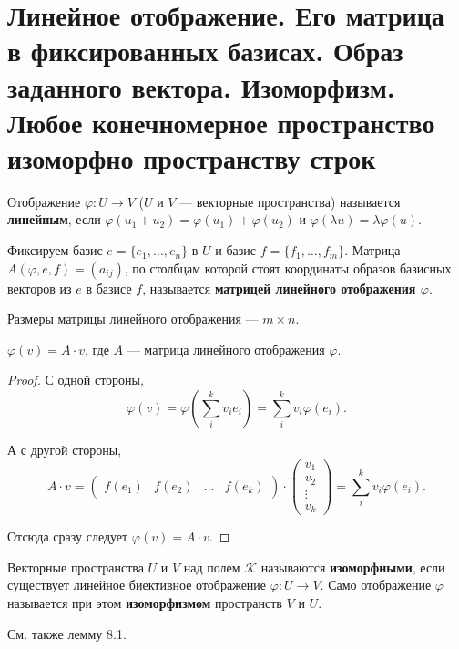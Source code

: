 \section{Линейное отображение. Его матрица в фиксированных базисах. Образ заданного вектора. Изоморфизм. Любое конечномерное пространство изоморфно пространству строк}

\begin{definition}
    Отображение $\varphi: U \rightarrow V$ ($U$ и $V$ --- векторные пространства) называется \textbf{линейным}, если $\varphi(u_1 + u_2) = \varphi(u_1) + \varphi(u_2)$ и $\varphi(\lambda u) = \lambda\varphi(u)$.
\end{definition}

\begin{definition}
    Фиксируем базис $e = \{e_1, \ldots, e_n\}$ в $U$ и базис $f = \{f_1, \ldots, f_m\}$. Матрица $A(\varphi, e, f) = (a_{ij})$, по столбцам которой стоят координаты образов базисных векторов из $e$ в базисе $f$, называется \textbf{матрицей линейного отображения $\varphi$}.
\end{definition}

\begin{remark}
    Размеры матрицы линейного отображения --- $m \times n$.
\end{remark}

\begin{statement}
    $\varphi(v) = A \cdot v$, где $A$ --- матрица линейного отображения $\varphi$.
\end{statement}

\begin{proof}
    С одной стороны,
    $$
    \varphi(v) = \varphi\left(\sum_i^kv_ie_i\right) = \sum_i^kv_i\varphi(e_i).
    $$

    А с другой стороны,
    $$
    A \cdot v = 
    \begin{pmatrix}
        f(e_1) & f(e_2) & \ldots & f(e_k)
    \end{pmatrix} \cdot
    \begin{pmatrix}
        v_1\\
        v_2\\
        \vdots\\
        v_k
    \end{pmatrix} = \sum_i^kv_i\varphi(e_i).
    $$

    Отсюда сразу следует $\varphi(v) = A \cdot v$.
\end{proof}

\begin{definition}
    Векторные пространства $U$ и $V$ над полем $\mathcal{K}$ называются \textbf{изоморфными}, если существует линейное биективное отображение $\varphi: U \rightarrow V$. Само отображение $\varphi$ называется при этом \textbf{изоморфизмом} пространств $V$ и $U$.
\end{definition}

См. также лемму 8.1.



